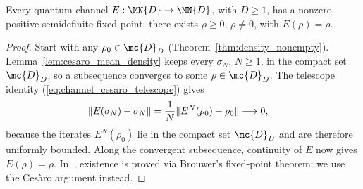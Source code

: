 \begin{theorem}\label{thm:cesaro_fixedpoint}
    \leanok
    Every quantum channel $E:\MN{D}\to\MN{D}$, with $D\geq1$, has a nonzero
    positive semidefinite fixed point: there exists $\rho\geq0$, $\rho\neq0$,
    with $E(\rho)=\rho$.
\end{theorem}

\begin{proof}
    \leanok
    Start with any $\rho_0\in\mc{D}_D$
    (Theorem~\ref{thm:density_nonempty}).
    Lemma~\ref{lem:cesaro_mean_density} keeps every $\sigma_N$, $N\geq1$,
    in the compact set $\mc{D}_D$, so a subsequence converges to some
    $\rho\in\mc{D}_D$. The telescope identity
    (\ref{eq:channel_cesaro_telescope}) gives
    \begin{align}
        \lVert E(\sigma_N)-\sigma_N\rVert
         & =\frac{1}{N}\lVert E^N(\rho_0)-\rho_0\rVert
        \longrightarrow0,
        \notag
    \end{align}
    because the iterates $E^N(\rho_0)$ lie in the compact set
    $\mc{D}_D$ and are therefore uniformly bounded. Along the convergent
    subsequence, continuity of $E$ now gives $E(\rho)=\rho$.
    In~\cite[Theorem~6.11]{Wolf2012Quantum}, existence is proved
    via Brouwer's fixed-point theorem; we use the Ces\`aro
    argument instead.
\end{proof}
